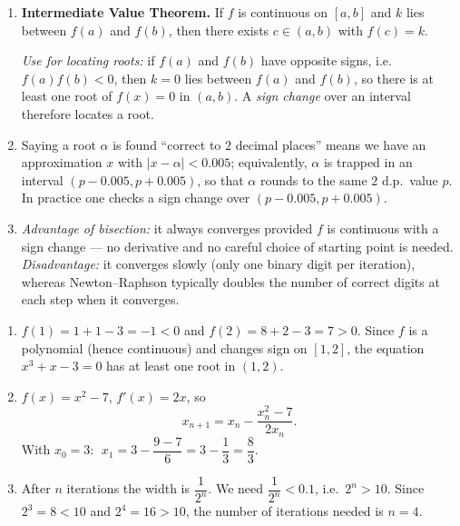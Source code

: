 \documentclass[11pt]{article}
\begin{document}
\begin{corrige}
\begin{enumerate}
\item \textbf{Intermediate Value Theorem.} If $f$ is continuous on $[a,b]$ and $k$ lies between $f(a)$ and $f(b)$, then there exists $c\in(a,b)$ with $f(c)=k$.

\emph{Use for locating roots:} if $f(a)$ and $f(b)$ have opposite signs, i.e.\ $f(a)f(b)<0$, then $k=0$ lies between $f(a)$ and $f(b)$, so there is at least one root of $f(x)=0$ in $(a,b)$. A \emph{sign change} over an interval therefore locates a root.
\item Saying a root $\alpha$ is found ``correct to $2$ decimal places'' means we have an approximation $x$ with $|x-\alpha|<0.005$; equivalently, $\alpha$ is trapped in an interval $(p-0.005,p+0.005)$, so that $\alpha$ rounds to the same $2$ d.p.\ value $p$. In practice one checks a sign change over $(p-0.005,p+0.005)$.
\item \emph{Advantage of bisection:} it always converges provided $f$ is continuous with a sign change — no derivative and no careful choice of starting point is needed. \emph{Disadvantage:} it converges slowly (only one binary digit per iteration), whereas Newton--Raphson typically doubles the number of correct digits at each step when it converges.
\end{enumerate}
\end{corrige}

\begin{corrige}
\begin{enumerate}
\item $f(1)=1+1-3=-1<0$ and $f(2)=8+2-3=7>0$. Since $f$ is a polynomial (hence continuous) and changes sign on $[1,2]$, the equation $x^{3}+x-3=0$ has at least one root in $(1,2)$.
\item $f(x)=x^{2}-7$, $f'(x)=2x$, so
\[
x_{n+1}=x_{n}-\frac{x_{n}^{2}-7}{2x_{n}}.
\]
With $x_{0}=3$: $\;x_{1}=3-\dfrac{9-7}{6}=3-\dfrac{1}{3}=\dfrac{8}{3}$.
\item After $n$ iterations the width is $\dfrac{1}{2^{n}}$. We need $\dfrac{1}{2^{n}}<0.1$, i.e.\ $2^{n}>10$. Since $2^{3}=8<10$ and $2^{4}=16>10$, the number of iterations needed is $\boxed{n=4}$.
\end{enumerate}
\end{corrige}
\end{document}

